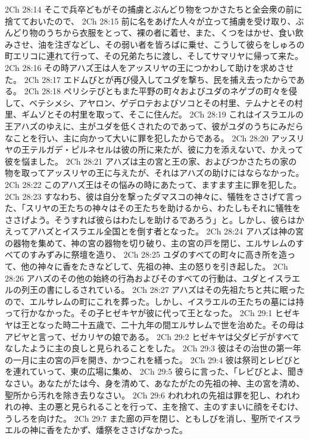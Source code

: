 2Ch 28:14  そこで兵卒どもがその捕虜とぶんどり物をつかさたちと全会衆の前に捨てておいたので、
2Ch 28:15  前に名をあげた人々が立って捕虜を受け取り、ぶんどり物のうちから衣服をとって、裸の者に着せ、また、くつをはかせ、食い飲みさせ、油を注ぎなどし、その弱い者を皆ろばに乗せ、こうして彼らをしゅろの町エリコに連れて行って、その兄弟たちに渡し、そしてサマリヤに帰って来た。
2Ch 28:16  その時アハズ王は人をアッスリヤの王につかわして助けを求めさせた。
2Ch 28:17  エドムびとが再び侵入してユダを撃ち、民を捕え去ったからである。
2Ch 28:18  ペリシテびともまた平野の町々およびユダのネゲブの町々を侵して、ベテシメシ、アヤロン、ゲデロテおよびソコとその村里、テムナとその村里、ギムゾとその村里を取って、そこに住んだ。
2Ch 28:19  これはイスラエルの王アハズのゆえに、主がユダを低くされたのであって、彼がユダのうちにみだらなことを行い、主に向かって大いに罪を犯したからである。
2Ch 28:20  アッスリヤの王テルガデ・ピルネセルは彼の所に来たが、彼に力を添えないで、かえって彼を悩ました。
2Ch 28:21  アハズは主の宮と王の家、およびつかさたちの家の物を取ってアッスリヤの王に与えたが、それはアハズの助けにはならなかった。
2Ch 28:22  このアハズ王はその悩みの時にあたって、ますます主に罪を犯した。
2Ch 28:23  すなわち、彼は自分を撃ったダマスコの神々に、犠牲をささげて言った、「スリヤの王たちの神々はその王たちを助けるから、わたしもそれに犠牲をささげよう。そうすれば彼らはわたしを助けるであろう」と。しかし、彼らはかえってアハズとイスラエル全国とを倒す者となった。
2Ch 28:24  アハズは神の宮の器物を集めて、神の宮の器物を切り破り、主の宮の戸を閉じ、エルサレムのすべてのすみずみに祭壇を造り、
2Ch 28:25  ユダのすべての町々に高き所を造って、他の神々に香をたきなどして、先祖の神、主の怒りを引き起した。
2Ch 28:26  アハズのその他の始終の行為およびそのすべての行動は、ユダとイスラエルの列王の書にしるされている。
2Ch 28:27  アハズはその先祖たちと共に眠ったので、エルサレムの町にこれを葬った。しかし、イスラエルの王たちの墓には持って行かなかった。その子ヒゼキヤが彼に代って王となった。
2Ch 29:1  ヒゼキヤは王となった時二十五歳で、二十九年の間エルサレムで世を治めた。その母はアビヤと言って、ゼカリヤの娘である。
2Ch 29:2  ヒゼキヤは父ダビデがすべてなしたように主の良しと見られることをした。
2Ch 29:3  彼はその治世の第一年の一月に主の宮の戸を開き、かつこれを繕った。
2Ch 29:4  彼は祭司とレビびとを連れていって、東の広場に集め、
2Ch 29:5  彼らに言った、「レビびとよ、聞きなさい。あなたがたは今、身を清めて、あなたがたの先祖の神、主の宮を清め、聖所から汚れを除き去りなさい。
2Ch 29:6  われわれの先祖は罪を犯し、われわれの神、主の悪と見られることを行って、主を捨て、主のすまいに顔をそむけ、うしろを向けた。
2Ch 29:7  また廊の戸を閉じ、ともしびを消し、聖所でイスラエルの神に香をたかず、燔祭をささげなかった。
